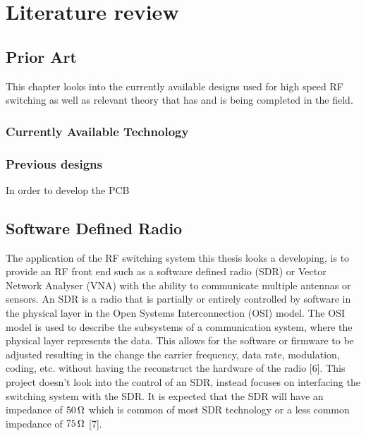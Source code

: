 \documentclass[12pt,openany,a4paper]{book}
\newcommand{\ohm}	{\ensuremath{\rm\,\Omega}}
\begin{document}













\chapter{Literature review}
\section{Prior Art}
This chapter looks into the currently available designs used for high speed RF switching as well as relevant theory that has and is being completed in the field.


\subsection{Currently Available Technology}


\subsection{Previous designs}
In order to develop the PCB 




\section{Software Defined Radio}
The application of the RF switching system this thesis looks a developing, is to provide an RF front end such as a software defined radio (SDR) or Vector Network Analyser (VNA) with the ability to communicate multiple antennas or sensors. An SDR is a radio that is partially or entirely controlled by software in the physical layer in the Open Systems Interconnection (OSI) model. The OSI model is used to describe the subsystems of a communication system, where the physical layer represents the data. This allows for the software or firmware to be adjusted resulting in the change the carrier frequency, data rate, modulation, coding, etc. without having the reconstruct the hardware of the radio [6]. This project doesn't look into the control of an SDR, instead focuses on interfacing the switching system with the SDR. It is expected that the SDR will have an impedance of $50\ohm$ which is common of most SDR technology or a less common impedance of $75\ohm$ [7].
\end{document}
